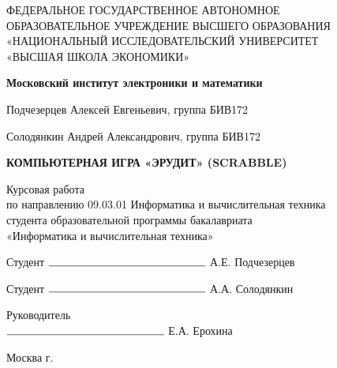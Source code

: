 \begin{titlepage}
	\begin{center}
		ФЕДЕРАЛЬНОЕ  ГОСУДАРСТВЕННОЕ АВТОНОМНОЕ \\
		ОБРАЗОВАТЕЛЬНОЕ УЧРЕЖДЕНИЕ ВЫСШЕГО ОБРАЗОВАНИЯ\\
		«НАЦИОНАЛЬНЫЙ ИССЛЕДОВАТЕЛЬСКИЙ УНИВЕРСИТЕТ\\
		«ВЫСШАЯ ШКОЛА ЭКОНОМИКИ»
	\end{center}
	
	\begin{center}
		\textbf{Московский институт электроники и математики}
	\end{center}
	\vspace{1ex}	
	\begin{center}
		Подчезерцев Алексей Евгеньевич, группа БИВ172
		
		Солодянкин Андрей Александрович, группа БИВ172
	\end{center}	
	\vspace{1ex}
	\begin{center}
		\textbf{КОМПЬЮТЕРНАЯ ИГРА «ЭРУДИТ» (SCRABBLE)}
	\end{center}	
	\vspace{2ex}
	\begin{center}
		Курсовая работа\\
		по направлению 09.03.01 Информатика и вычислительная техника\\
		студента образовательной программы бакалавриата\\
		«Информатика и вычислительная техника»
	\end{center}
	\vspace{2ex}
	\begin{flushright}
		Студент $\rule{5cm}{0.15mm}$ А.Е. Подчезерцев 
		
		Студент $\rule{5cm}{0.15mm}$ А.А. Солодянкин 
	\end{flushright}
	\vspace{3ex}
	\begin{flushright}
		Руководитель\\
		$\rule{5cm}{0.15mm}$ Е.А. Ерохина
	\end{flushright}
	\vfill
	\begin{center}
		Москва \the\year г.
	\end{center}
\end{titlepage}